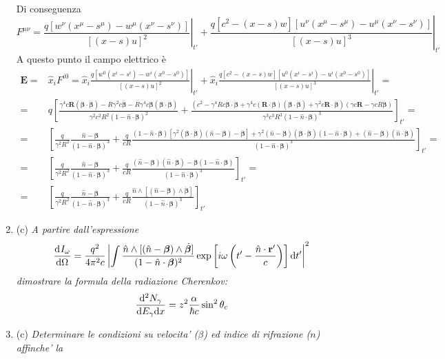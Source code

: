 \documentclass{article}
\renewcommand{\c}{(c)}
\renewcommand{\t}[1]{\textit{ #1}}
\renewcommand{\vec}[1]{\mathbf{#1}}
\begin{document}
\begin{enumerate}
\begin{align*}
	\end{align*}
	Di conseguenza
	\[F^{\mu\nu}=\left.\frac{q[w^\nu(x^\mu-s^\mu)-w^\mu(x^\nu-s^\nu)]}{[(x-s)u]^2}\right|_{t'}+\left.\frac{q[c^2-(x-s)w][u^\nu(x^\mu-s^\mu)-u^\mu(x^\nu-s^\nu)]}{[(x-s)u]^3}\right|_{t'}\]
	A questo punto il campo elettrico è
	\begin{align*}
		\vec{E}=&\hat{x}_iF^{i0}=\hat{x}_i\left.\frac{q[w^0(x^i-s^i)-w^i(x^0-s^0)]}{[(x-s)u]^2}\right|_{t'}+\hat{x}_i\left.\frac{q[c^2-(x-s)w][u^0(x^i-s^i)-u^i(x^0-s^0)]}{[(x-s)u]^3}\right|_{t'}=\\=&q\left[\frac{\gamma^4c\vec{R}(\bm{\beta}\cdot\dot{\bm{\beta}})-R\gamma^2c\dot{\bm{\beta}}-R\gamma^4c\bm{\beta}(\bm{\beta}\cdot\dot{\bm{\beta}})}{\gamma^2c^2R^2(1-\hat{n}\cdot\bm{\beta})^2}+\frac{(c^2-\gamma^4Rc\bm{\beta}\cdot\dot{\bm{\beta}}+\gamma^4c(\vec{R}\cdot\bm{\beta})(\bm{\beta}\cdot\dot{\bm{\beta}})+\gamma^2c\vec{R}\cdot\dot{\bm{\beta}})(\gamma c\vec{R}-\gamma cR\bm{\beta})}{\gamma^3c^3R^3(1-\hat{n}\cdot\bm{\beta})^3}\right]_{t'}=\\=&\left[\frac{q}{\gamma^2R^2}\frac{\hat{n}-\bm{\beta}}{(1-\hat{n}\cdot\bm{\beta})^3}+\frac{q}{cR}\frac{(1-\hat{n}\cdot\bm{\beta})[\gamma^2(\bm{\beta}\cdot\dot{\bm{\beta}})(\hat{n}-\bm{\beta})-\dot{\bm{\beta}}]+\gamma^2(\hat{n}-\bm{\beta})(\bm{\beta}\cdot\dot{\bm{\beta}})(1-\hat{n}\cdot\bm{\beta})+(\hat{n}-\bm{\beta})(\hat{n}\cdot\dot{\bm{\beta}})}{(1-\hat{n}\cdot\bm{\beta})^3}\right]_{t'}=\\=&\left[\frac{q}{\gamma^2R^2}\frac{\hat{n}-\bm{\beta}}{(1-\hat{n}\cdot\bm{\beta})^3}+\frac{q}{cR}\frac{(\hat{n}-\bm{\beta})(\hat{n}\cdot\dot{\bm{\beta}})-\dot{\bm{\beta}}(1-\hat{n}\cdot\bm{\beta})}{(1-\hat{n}\cdot\bm{\beta})^3}\right]_{t'}=\\=&\left[\frac{q}{\gamma^2R^2}\frac{\hat{n}-\bm{\beta}}{(1-\hat{n}\cdot\bm{\beta})^3}+\frac{q}{cR}\frac{\hat{n}\wedge[(\hat{n}-\bm{\beta})\wedge\dot{\bm{\beta}}]}{(1-\hat{n}\cdot\bm{\beta})^3}\right]_{t'}
	\end{align*}
	\item\c\t{A partire dall’espressione
		\[\der{I_\omega}{\Omega}=\frac{q^2}{4\pi^2c}\left|\int\frac{\hat{n}\wedge[(\hat{n}-\bm{\beta})\wedge\dot{\bm{\beta}}]}{(1-\hat{n}\cdot\bm{\beta})^2}\exp\left[i\omega\left(t'-\frac{\hat{n}\cdot\vec{r}'}{c}\right)\right]\d t'\right|^2\] dimostrare la
		formula della radiazione Cherenkov:
		\[\frac{\mathrm{d} ^2 N_\gamma}{\mathrm{d} E_\gamma \mathrm{d} x}=z^2\frac{\alpha}{\hbar c}\sin^2\theta_c\]}
	\item\c\t{Determinare le condizioni su velocita’ ($\beta$) ed indice di rifrazione ($n$) affinche’ la
}
\end{enumerate}
\end{document}
